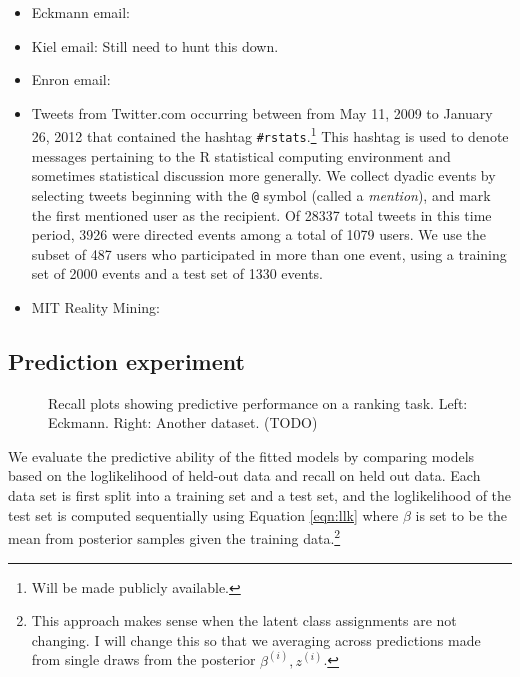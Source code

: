 \documentclass[11pt]{article}
\begin{document}
\begin{itemize}
\item Eckmann email:
\item Kiel email: Still need to hunt this down.
\item Enron email:
\item Tweets from Twitter.com occurring between from May 11, 2009 to January 26, 2012 that contained the hashtag \texttt{\#rstats}.\footnote{Will be made publicly available.}  This hashtag is used to denote messages pertaining to the R statistical computing environment and sometimes statistical discussion more generally.  We collect dyadic events by selecting tweets beginning with the \texttt{@} symbol (called a \emph{mention}), and mark the first mentioned user as the recipient.  Of 28337 total tweets in this time period, 3926 were directed events among a total of 1079 users.  We use the subset of 487 users who participated in more than one event, using a training set of 2000 events and a test set of 1330 events.
\item MIT Reality Mining: 
\end{itemize}

\subsection*{Prediction experiment}


\begin{figure}[th]
\caption{Recall plots showing predictive performance on a ranking task.  Left: Eckmann.  Right: Another dataset.  (TODO)}
\label{fig:recall}
\end{figure}



We evaluate the predictive ability of the fitted models by comparing models based on the loglikelihood of held-out data and recall on held out data.  Each data set is first split into a training set and a test set, and the loglikelihood of the test set is computed sequentially using Equation \ref{eqn:llk} where $\beta$ is set to be the mean from posterior samples given the training data.\footnote{This approach makes sense when the latent class assignments are not changing.  I will change this so that we averaging across predictions made from single draws from the posterior $\beta^{(i)}, z^{(i)}$.}
\end{document}

